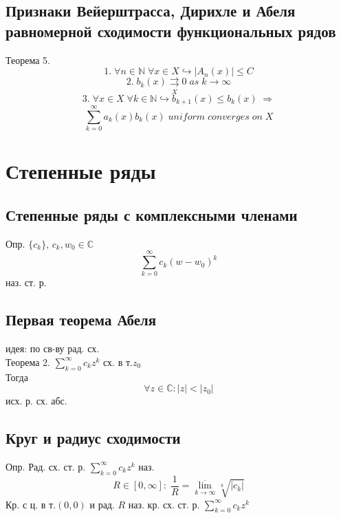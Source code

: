 \documentclass{article}
\begin{document}
\subsection{Признаки Вейерштрасса, Дирихле и Абеля равномерной сходимости функциональных рядов}
Теорема 5.
\begin{equation*}
    1. \; \forall n \in \mathbb N \; \forall x \in X \hookrightarrow |A_n(x)| \leq C
\end{equation*}
\begin{equation*}
    2. \; b_k (x) \underset{X}{\rightrightarrows} 0 \; as\; k \rightarrow \infty
\end{equation*}
\begin{equation*}
    3. \; \forall x \in X \; \forall k \in \mathbb N \hookrightarrow b_{k+1}(x) \leq b_k(x) \; \Rightarrow
\end{equation*}
\begin{equation*}
    \sum_{k=0}^\infty a_k(x)b_k(x) \; uniform \; converges \; on \; X
\end{equation*}


\newpage
\section{Степенные ряды}
\subsection{Степенные ряды с комплексными членами}
Опр. $\{ c_k \}$, $c_k, w_0 \in \mathbb C$
\begin{equation*}
    \sum_{k=0}^\infty c_k (w-w_0)^k
\end{equation*}
наз. ст. р.
\subsection{Первая теорема Абеля}
идея: по св-ву рад. сх. \\
Теорема 2. $\sum_{k=0}^\infty c_k z^k$ сх. в т.$z_0$ \\
Тогда
\begin{equation*}
    \forall z \in \mathbb C: |z| < |z_0|
\end{equation*}
исх. р. сх. абс.
\subsection{Круг и радиус сходимости}
Опр. Рад. сх. ст. р. $\sum_{k=0}^\infty c_k z^k$ наз.
\begin{equation*}
    R \in [0, \infty]: \; \frac{1}{R} = \underset{k \rightarrow \infty}{\overline{\lim}} \sqrt[k]{|c_k|}
\end{equation*}
Кр. с ц. в т.$(0,0)$ и рад. $R$ наз. кр. сх. ст. р. $\sum_{k=0}^\infty c_k z^k$
\end{document}
